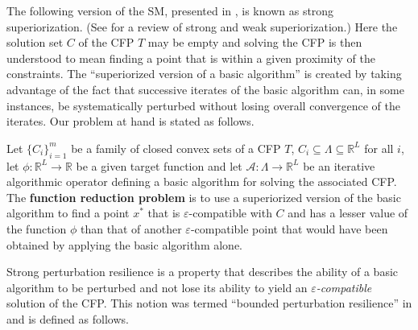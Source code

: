 \documentclass[smallextended]{svjour3}      %
\begin{document}
The following version of the SM, presented in \cite{herman2012superiorization}, is known as strong superiorization. (See \cite{censor2015weakstrong} for a review of strong and weak superiorization.) Here the solution set $C$ of the CFP $T$ may be empty and solving the CFP is then understood to mean finding a point that is within a given proximity of the constraints. The ``superiorized version of a basic algorithm'' is created by taking advantage of the fact that successive iterates of the basic algorithm can, in some instances, be systematically perturbed without losing overall convergence of the iterates. Our problem at hand is stated as follows.
\begin{problem}
	
Let $\lbrace C_{i}\rbrace_{i=1}^{m}$ be a family of closed convex sets of a CFP $T$, $C_{i}\subseteq\Lambda\subseteq\mathbb{R}^{L}$ for all $i$, let $\phi:\mathbb{R}^{L}\rightarrow\mathbb{R}$ be a given target function and let $\mathcal{A}:\Lambda\rightarrow\mathbb{R}^{L}$ be an iterative algorithmic operator defining a basic algorithm for solving the associated CFP. The \textbf{function reduction problem} is to use a superiorized version of the basic algorithm to find a point $x^{*}$ that is $\varepsilon$-compatible with $C$ and has a lesser value of the function $\phi$ than that of another $\varepsilon$-compatible point that would have been obtained by applying the basic algorithm alone.
\end{problem}
Strong perturbation resilience is a property that describes the ability of a basic algorithm to be perturbed and not lose its ability to yield an \textit{$\varepsilon$-compatible} solution of the CFP. This notion was termed ``bounded perturbation resilience'' in \cite[Subsection II.C]{herman2012superiorization} and is defined as follows.
\end{document}
